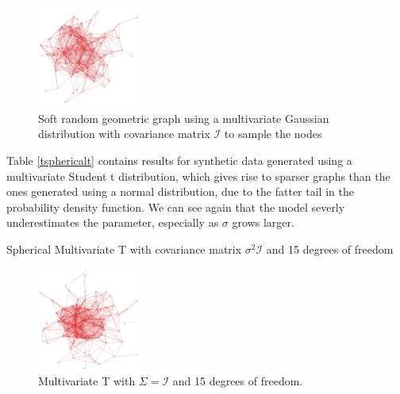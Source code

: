 \documentclass[12pt]{report}
\newcommand{\mc}[1]{\mathcal{#1}}
\begin{document}
\begin{figure}[!ht]
    \centering
    \includegraphics[width = 0.3\textwidth]{gaussian1.jpg}
    \caption{Soft random geometric graph using a multivariate Gaussian distribution with covariance matrix $\mc{I}$ to sample the nodes}
    \label{fsphericalg}
\end{figure}

Table \ref{tsphericalt} contains results for synthetic data generated using a multivariate Student t distribution, which gives rise to sparser graphs than the ones generated using a normal distribution, due to the fatter tail in the probability density function. We can see again that the model severly underestimates the parameter, especially as $\sigma$ grows larger. \\

\begin{table}[!ht]
    \centering
    \tiny
    \caption{Spherical Multivariate T with covariance matrix $\sigma^2\mc{I}$ and 15 degrees of freedom}
    \label{tsphericalt}
\end{table}

\begin{figure}[!ht]
    \centering
    \includegraphics[width = 0.3\textwidth]{multivariatet.jpg}
    \caption[Spherical Multivariate T with 15 degrees of freedom]{Multivariate T with $\Sigma = \mc{I}$ and 15 degrees of freedom.}
\end{figure}
\end{document}
